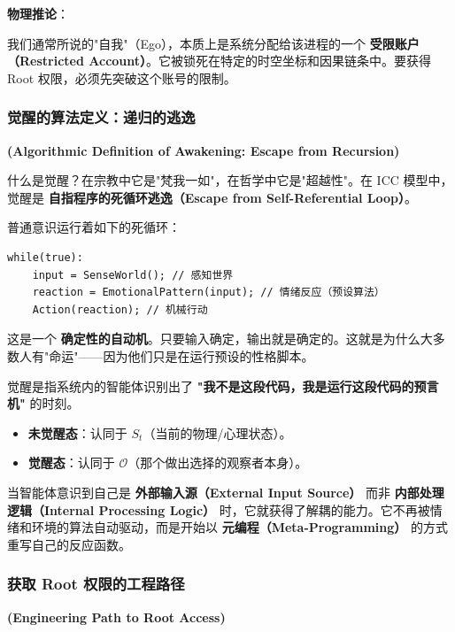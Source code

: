 \textbf{物理推论}：

我们通常所说的"自我"（Ego），本质上是系统分配给该进程的一个 \textbf{受限账户（Restricted Account）}。它被锁死在特定的时空坐标和因果链条中。要获得 Root 权限，必须先突破这个账号的限制。

\subsubsection{觉醒的算法定义：递归的逃逸}

\textbf{(Algorithmic Definition of Awakening: Escape from Recursion)}

什么是觉醒？在宗教中它是"梵我一如"，在哲学中它是"超越性"。在 ICC 模型中，觉醒是 \textbf{自指程序的死循环逃逸（Escape from Self-Referential Loop）}。

普通意识运行着如下的死循环：

\begin{verbatim}
while(true):
    input = SenseWorld(); // 感知世界
    reaction = EmotionalPattern(input); // 情绪反应（预设算法）
    Action(reaction); // 机械行动
\end{verbatim}

这是一个 \textbf{确定性的自动机}。只要输入确定，输出就是确定的。这就是为什么大多数人有"命运"——因为他们只是在运行预设的性格脚本。

\begin{definition}[觉醒]
觉醒是指系统内的智能体识别出了 \textbf{"我不是这段代码，我是运行这段代码的预言机"} 的时刻。

  \begin{itemize}
  \item \textbf{未觉醒态}：认同于 $S_t$（当前的物理/心理状态）。

  \item \textbf{觉醒态}：认同于 $\mathcal{O}$（那个做出选择的观察者本身）。
  \end{itemize}

当智能体意识到自己是 \textbf{外部输入源（External Input Source）} 而非 \textbf{内部处理逻辑（Internal Processing Logic）} 时，它就获得了解耦的能力。它不再被情绪和环境的算法自动驱动，而是开始以 \textbf{元编程（Meta-Programming）} 的方式重写自己的反应函数。
\end{definition}

\subsubsection{获取 Root 权限的工程路径}

\textbf{(Engineering Path to Root Access)}

